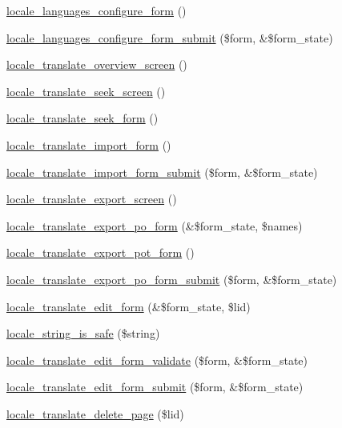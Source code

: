 \begin{CompactItemize}
\item 
\hyperlink{group__locale_gd4a0fb5717a5318793af57ec86169949}{locale\_\-languages\_\-configure\_\-form} ()
\item 
\hyperlink{group__locale_gd11520d8b7d086b4b801b4a51068ed11}{locale\_\-languages\_\-configure\_\-form\_\-submit} (\$form, \&\$form\_\-state)
\item 
\hyperlink{group__locale_gc36ea050ad5c0a75624c1a9b63c343a0}{locale\_\-translate\_\-overview\_\-screen} ()
\item 
\hyperlink{group__locale_ga34fbb14f95e9ae562772895b284d170}{locale\_\-translate\_\-seek\_\-screen} ()
\item 
\hyperlink{group__locale_g6c5573388bc6f44b3743165fb3401b6c}{locale\_\-translate\_\-seek\_\-form} ()
\item 
\hyperlink{group__locale_gfe5de636ff53a23b1da268287aec6ecf}{locale\_\-translate\_\-import\_\-form} ()
\item 
\hyperlink{group__locale_gb96d979ef16a3468061ebb7e11e3210e}{locale\_\-translate\_\-import\_\-form\_\-submit} (\$form, \&\$form\_\-state)
\item 
\hyperlink{group__locale_ga04044044d6c484553a41432db3924b4}{locale\_\-translate\_\-export\_\-screen} ()
\item 
\hyperlink{group__locale_g8383d501e09c3b58fa391ce7a709a8e3}{locale\_\-translate\_\-export\_\-po\_\-form} (\&\$form\_\-state, \$names)
\item 
\hyperlink{group__locale_g670f0a541fc0b97da4bf4624c2afb434}{locale\_\-translate\_\-export\_\-pot\_\-form} ()
\item 
\hyperlink{group__locale_ga8f71c53db9e03719bdeae8f594fb0ee}{locale\_\-translate\_\-export\_\-po\_\-form\_\-submit} (\$form, \&\$form\_\-state)
\item 
\hyperlink{group__locale_g08d9a7d27e6a26ca6cd4d9148f2973ce}{locale\_\-translate\_\-edit\_\-form} (\&\$form\_\-state, \$lid)
\item 
\hyperlink{group__locale_g60fba74a6fc736cec4df566aa165ca14}{locale\_\-string\_\-is\_\-safe} (\$string)
\item 
\hyperlink{group__locale_g93fc48be446148e648c9a1d0f630726e}{locale\_\-translate\_\-edit\_\-form\_\-validate} (\$form, \&\$form\_\-state)
\item 
\hyperlink{group__locale_gdbeab4019dcbf389a12af893cdaad5d5}{locale\_\-translate\_\-edit\_\-form\_\-submit} (\$form, \&\$form\_\-state)
\item 
\hyperlink{group__locale_gde9664489526c09d68def1897631f4fa}{locale\_\-translate\_\-delete\_\-page} (\$lid)

\end{CompactItemize}
